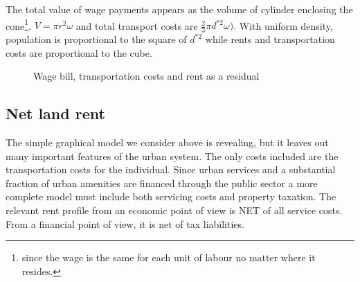 The total value of wage payments appears as the volume of cylinder enclosing the cone\footnote{since the wage is the same for each unit of labour no matter where it resides.}.  
$V=\pi r^2 \omega$ 
and total transport costs are 
$\frac{2}{3}\pi  d^{*2} \omega).$
With uniform density, population is proportional to the square of  $d^{*2}$ while rents and  transportation costs are proportional to the cube. %

\begin{figure}
    \begin{center}
    
    \caption{Wage bill, transportation costs and rent as a residual  }
    \label{fig-city-conical}
    \end{center}
\end{figure}

\subsection{Net land rent} 
The simple graphical model we consider above is revealing, but it leaves out many important features of the urban system. The only costs included are the transportation costs for the individual.  Since urban services and  a substantial fraction of urban amenities are financed through the public sector a more complete model must include both servicing costs and property taxation. The relevant rent profile from an economic point of view is NET of all service costs. From a financial point of view, it is net of tax liabilities.%

